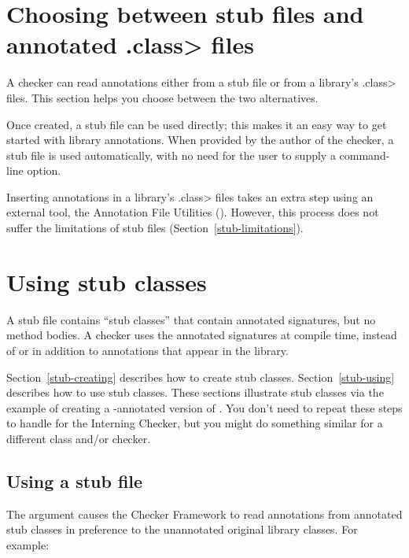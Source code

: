 \section{Choosing between stub files and annotated \<.class> files\label{stub-vs-class-files}}

A checker can read annotations either from a stub file or from a library's
\<.class> files.  This section helps you choose between the two alternatives.

Once created, a stub file can be used directly; this makes it an easy way
to get started with library annotations.
When provided by the author of the checker, a stub file is used
automatically, with no need for the user to supply a command-line option.

Inserting annotations in a library's \<.class> files takes an extra step
using an external tool, the Annotation File Utilities
().
However, this process does not suffer the limitations of stub files
(Section~\ref{stub-limitations}).


\section{Using stub classes\label{stub}\label{stub-creating-and-using}}

A stub file contains ``stub classes'' that contain annotated signatures,
but no method bodies.  A
checker uses the annotated signatures at compile time, instead of or in
addition to annotations that appear in the library.

Section~\ref{stub-creating} describes how to create stub classes.
Section~\ref{stub-using} describes how to use stub classes.
These sections illustrate stub classes via the example of creating a -annotated
version of .  You don't need to repeat these steps
to handle  for the Interning Checker,
but you might do something similar for a different class and/or checker.



\subsection{Using a stub file\label{stub-using}}

The  argument causes the Checker Framework to read
annotations from annotated stub classes in preference to the unannotated
original library classes.  For example:

